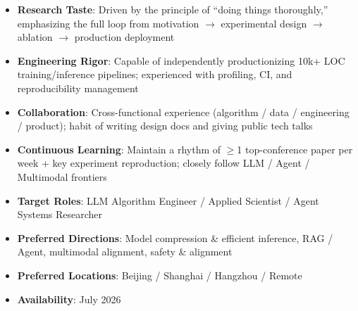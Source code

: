 

\begin{itemize}
  \item \textbf{Research Taste}: Driven by the principle of ``doing things thoroughly,'' emphasizing the full loop from motivation $\to$ experimental design $\to$ ablation $\to$ production deployment
  \item \textbf{Engineering Rigor}: Capable of independently productionizing 10k+ LOC training/inference pipelines; experienced with profiling, CI, and reproducibility management
  \item \textbf{Collaboration}: Cross-functional experience (algorithm / data / engineering / product); habit of writing design docs and giving public tech talks
  \item \textbf{Continuous Learning}: Maintain a rhythm of $\geq$1 top-conference paper per week + key experiment reproduction; closely follow LLM / Agent / Multimodal frontiers
\end{itemize}


\begin{itemize}
  \item \textbf{Target Roles}: LLM Algorithm Engineer / Applied Scientist / Agent Systems Researcher
  \item \textbf{Preferred Directions}: Model compression \& efficient inference, RAG / Agent, multimodal alignment, safety \& alignment
  \item \textbf{Preferred Locations}: Beijing / Shanghai / Hangzhou / Remote
  \item \textbf{Availability}: July 2026
\end{itemize}
